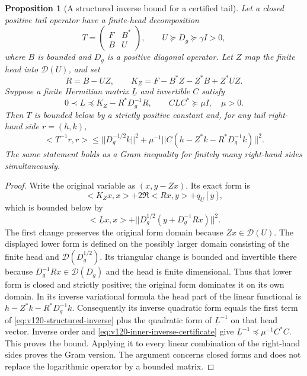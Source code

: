 \documentclass[11pt]{article}
\def\norm#1{||#1||}%
\def\ip#1#2{<#1,#2>}%
\newtheorem{proposition}[theorem]{Proposition}
\theoremstyle{remark}
\newcommand{\norm}[1]{\left\lVert #1\right\rVert}
\newcommand{\ip}[2]{\left\langle #1,#2\right\rangle}
\begin{document}
\begin{proposition}[A structured inverse bound for a certified tail]
\label{prop:v120-structured-inverse}
Let a closed positive tail operator have a finite-head decomposition
\[
 T=\begin{pmatrix}F&B^*\\ B&U\end{pmatrix},
 \qquad U\succeq D_g\succeq\gamma I>0,
\]
where $B$ is bounded and $D_g$ is a positive diagonal operator.
Let $Z$ map the finite head into $\mathcal D(U)$, and set
\[
 R=B-UZ,\qquad K_Z=F-B^*Z-Z^*B+Z^*UZ.
\]
Suppose a finite Hermitian matrix $\underline L$ and invertible $C$
satisfy
\begin{equation}\label{eq:v120-inner-inverse-certificate}
 0\prec\underline L\preceq K_Z-R^*D_g^{-1}R,
 \qquad C\underline L C^*\succeq\mu I,\quad\mu>0.
\end{equation}
Then $T$ is bounded below by a strictly positive constant and, for
any tail right-hand side $r=(h,k)$,
\begin{equation}\label{eq:v120-structured-inverse}
 \ip{T^{-1}r}{r}
 \le \norm{D_g^{-1/2}k}^2+
 \mu^{-1}\norm{C(h-Z^*k-R^*D_g^{-1}k)}^2.
\end{equation}
The same statement holds as a Gram inequality for finitely many
right-hand sides simultaneously.
\end{proposition}
\begin{proof}
Write the original variable as $(x,y-Zx)$. Its exact form is
\[
 \ip{K_Zx}{x}+2\Re\ip{Rx}{y}+q_U[y],
\]
which is bounded below by
\[
 \ip{\underline Lx}{x}
       +\norm{D_g^{1/2}(y+D_g^{-1}Rx)}^2.
\]
The first change preserves the original form domain because
$Zx\in\mathcal D(U)$. The displayed lower form is defined on the
possibly larger domain consisting of the finite head and
$\mathcal D(D_g^{1/2})$. Its triangular change is bounded and
invertible there because $D_g^{-1}Rx\in\mathcal D(D_g)$ and the
head is finite dimensional. Thus that lower form is closed and
strictly positive; the original form dominates it on its own domain.
In its inverse variational formula the head part of the linear
functional is $h-Z^*k-R^*D_g^{-1}k$. Consequently its inverse
quadratic form equals the first term of
\eqref{eq:v120-structured-inverse} plus the quadratic form of
$\underline L^{-1}$ on that head vector. Inverse order and
\eqref{eq:v120-inner-inverse-certificate} give
$\underline L^{-1}\preceq\mu^{-1}C^*C$. This proves the bound.
Applying it to every linear combination of the right-hand sides
proves the Gram version. The argument concerns closed forms and
does not replace the logarithmic operator by a bounded matrix.
\end{proof}
\end{document}
